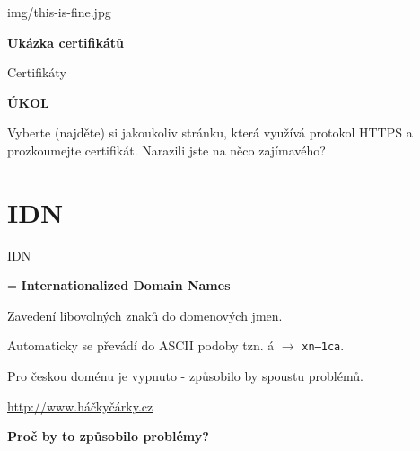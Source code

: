 \documentclass[aspectratio=1610]{beamer}
\begin{document}
\begin{frameImg}{img/this-is-fine.jpg}
    \vspace*{60mm}
    \begin{cardTiny}
        \vspace*{\fill}
        \begin{center}
            \textbf{Ukázka certifikátů}
        \end{center}
    \end{cardTiny}
\end{frameImg}

\begin{frame}{Certifikáty}
    \begin{cardTiny}
        \begin{center}
            \textbf{ÚKOL}
        \end{center}
        \begin{flushleft}
            Vyberte (najděte) si jakoukoliv stránku, která využívá protokol HTTPS a prozkoumejte certifikát. Narazili jste na něco zajímavého?
        \end{flushleft}
    \end{cardTiny}
\end{frame}



\section{IDN}

\begin{frame}{IDN}
    \begin{cardTiny}
        \begin{flushleft}
            = \textbf{Internationalized Domain Names}

            Zavedení libovolných znaků do domenových jmen.

            Automaticky se převádí do ASCII podoby tzn. á $\rightarrow$ \texttt{xn--1ca}.

            Pro českou doménu je vypnuto - způsobilo by spoustu problémů.

            \href{https://xn--hkyrky-ptac70bc.cz}{http://www.háčkyčárky.cz}
        \end{flushleft}
    \end{cardTiny}
    \begin{cardTiny}
        \begin{center}
            \textbf{Proč by to způsobilo problémy?}
        \end{center}
    \end{cardTiny}
\end{frame}
\end{document}

